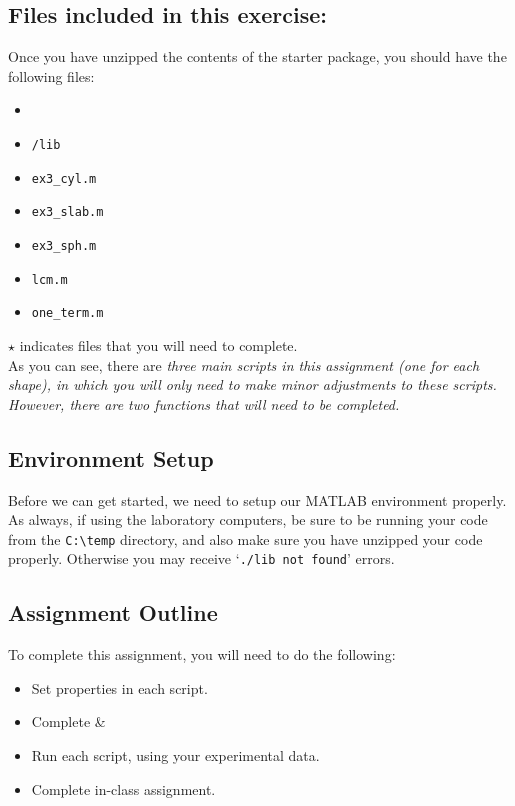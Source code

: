 \documentclass[11pt, letterpaper]{article}
\begin{document}
\subsection*{Files included in this exercise:}
Once you have unzipped the contents of the starter package, you should have the following files:

\begin{itemize}
\renewcommand\labelitemi{-- }
   \item {}
    \item \texttt{/lib}
\renewcommand\labelitemi{[$\star$]}
    \item  \texttt{ex3\_cyl.m}
    \item  \texttt{ex3\_slab.m}
    \item  \texttt{ex3\_sph.m}
    \item \texttt{lcm.m} 
    \item \texttt{one\_term.m} 
\end{itemize}

\noindent
$\star$ indicates files that you will need to complete.\\

\n
As you can see, there are \it{three} main scripts in this assignment (one for each shape), in which you will only need to make minor adjustments to these scripts. However, there are \it{two} functions that will need to be completed. 

\subsection*{Environment Setup}
Before we can get started, we need to setup our MATLAB environment properly. As always, if using the laboratory computers, be sure to be running your code from the \texttt{C:\textbackslash temp} directory, and also make sure you have unzipped your code properly. Otherwise you may receive `\texttt{./lib not found}' errors.

\subsection*{Assignment Outline}

To complete this assignment, you will need to do the following:

\begin{itemize}
    \item Set properties in each  script.
    \item Complete  \& 
    \item Run each script, using your experimental data.
    \item Complete in-class assignment.
\end{itemize}
\end{document}

